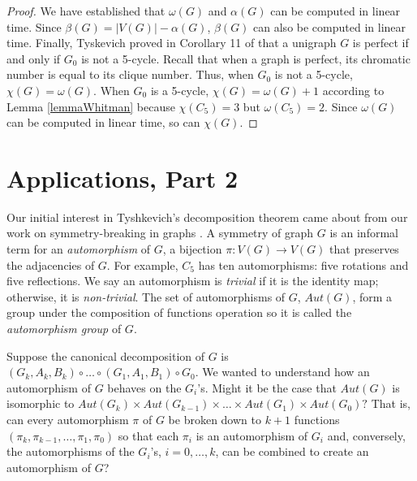 \documentclass[11pt]{article}
\begin{document}
\begin{proof}
 
 We have established that $\omega(G)$ and $\alpha(G)$ can be computed in linear time.  Since $\beta(G) = |V(G)| - \alpha(G)$, $\beta(G)$ can also be computed in linear time.  Finally,  Tyskevich proved in Corollary 11 of \cite{Ty00} that a unigraph $G$ is perfect if and only if $G_0$ is not a 5-cycle.   Recall that when a graph is perfect, its chromatic number is equal to its clique number.  Thus, when $G_0$ is not a 5-cycle, $\chi(G) = \omega(G)$.  When $G_0$ is a 5-cycle, $\chi(G) = \omega(G) +1$ according to Lemma \ref{lemmaWhitman} because $\chi(C_5) = 3$ but $\omega(C_5) = 2$.  Since $\omega(G)$ can be computed in linear time, so can $\chi(G)$. 
  \end{proof}





\section{Applications, Part 2}
\label{sec5}

Our initial interest in Tyshkevich's  decomposition theorem came about from our work on symmetry-breaking in graphs \cite{Ch06, ArChDe08, Ch09, Ch25}.  A symmetry of graph $G$ is an informal term for an {\it automorphism} of $G$, a bijection $\pi: V(G) \rightarrow V(G)$  that preserves the adjacencies of $G$.
For example,  $C_5$ has ten automorphisms:  five rotations and five reflections. We say an automorphism is {\it trivial} if it is the identity map; otherwise, it is {\it non-trivial}.  The set of automorphisms of $G$, $Aut(G)$,  form a group under the composition of functions operation so it is called the {\it automorphism group} of $G$.  

Suppose the canonical decomposition of $G$ is $(G_k , A_k, B_k)  \circ \hdots \circ (G_1, A_1, B_1) \circ G_0$.  We wanted to understand how an automorphism of $G$ behaves on the $G_i$'s.  
Might it be the case that $Aut(G)$ is isomorphic to $ Aut(G_k) \times Aut(G_{k-1}) \times \hdots \times Aut(G_1) \times Aut(G_0)?$
 That is, can every automorphism $\pi$ of $G$ be broken down to $k+1$ functions $(\pi_k, \pi_{k-1}, \hdots, \pi_1, \pi_0)$ so that each $\pi_i$ is an automorphism of $G_i$ and, conversely, the automorphisms of the $G_i$'s, $i = 0, \hdots, k$,  can be combined to create an automorphism of $G$?
\end{document}
